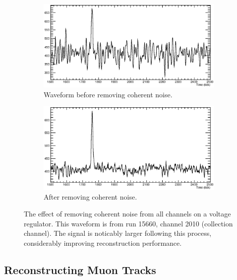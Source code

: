 \begin{figure}
  \centering
  \begin{subfigure}[t]{0.48\linewidth}
    \centering
    \includegraphics[width=\textwidth]{raw_noise.eps}
    \caption{Waveform before removing coherent noise.}
    \label{fig:CoherentNoiseRemovalNoise}
  \end{subfigure}
  \hfill
  \begin{subfigure}[t]{0.48\linewidth}
    \centering
    \includegraphics[width=\textwidth]{raw_nonoise.eps}
    \caption{After removing coherent noise.}
    \label{fig:CoherentNoiseRemovalNoNoise}
  \end{subfigure}
  \caption[Coherent noise removal in 35~ton data]{The effect of removing coherent noise from all channels on a voltage regulator.  This waveform is from run 15660, channel 2010 (collection channel).  The signal is noticably larger following this process, considerably improving reconstruction performance.}
  \label{fig:CoherentNoiseRemoval}
\end{figure}

\subsection{Reconstructing Muon Tracks}\label{sec:ReconstructingMuonTracks}

